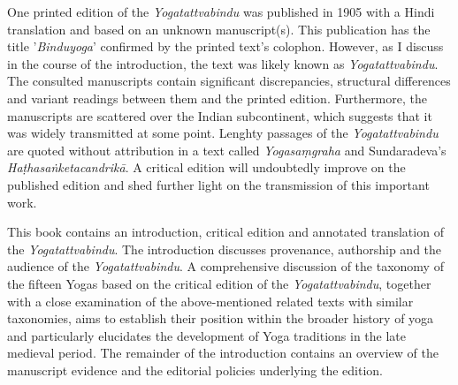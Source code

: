 One printed edition of the \textit{Yogatattvabindu} was published in 1905 with a Hindi translation and based on an unknown manuscript(s). This publication has the title ’\textit{Binduyoga}’ confirmed by the printed text’s colophon. However, as I discuss in the course of the introduction, the text was likely known as \textit{Yogatattvabindu}. The consulted manuscripts contain significant discrepancies, structural differences and variant readings between them and the printed edition. Furthermore, the manuscripts are scattered over the Indian subcontinent, which suggests that it was widely transmitted at some point. Lenghty passages of the \textit{Yogatattvabindu} are quoted without attribution in a text called \textit{Yogasaṃgraha} and Sundaradeva’s \textit{Haṭhasaṅketacandrikā}. A critical edition will undoubtedly improve on the published edition and shed further light on the transmission of this important work.

This book contains an introduction, critical edition and annotated translation of the \textit{Yogatattvabindu}. The introduction discusses provenance, authorship and the audience of the \textit{Yogatattvabindu}. A comprehensive discussion of the taxonomy of the fifteen Yogas based on the critical edition of the \textit{Yogatattvabindu}, together with a close examination of the above-mentioned related texts with similar taxonomies, aims to establish their position within the broader history of yoga and particularly elucidates the development of Yoga traditions in the late medieval period. The remainder of the introduction contains an overview of the manuscript evidence and the editorial policies underlying the edition.

